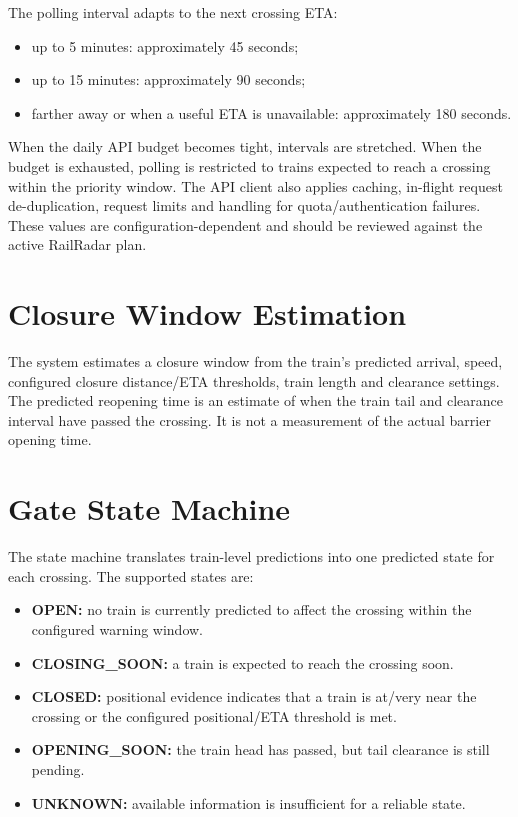 \documentclass[11pt,a4paper]{report}
\begin{document}
The polling interval adapts to the next crossing ETA:
\begin{itemize}
  \item up to 5 minutes: approximately 45 seconds;
  \item up to 15 minutes: approximately 90 seconds;
  \item farther away or when a useful ETA is unavailable: approximately 180 seconds.
\end{itemize}
When the daily API budget becomes tight, intervals are stretched. When the budget is exhausted, polling is restricted to trains expected to reach a crossing within the priority window. The API client also applies caching, in-flight request de-duplication, request limits and handling for quota/authentication failures. These values are configuration-dependent and should be reviewed against the active RailRadar plan.

\section{Closure Window Estimation}
The system estimates a closure window from the train's predicted arrival, speed, configured closure distance/ETA thresholds, train length and clearance settings. The predicted reopening time is an estimate of when the train tail and clearance interval have passed the crossing. It is not a measurement of the actual barrier opening time.

\section{Gate State Machine}
The state machine translates train-level predictions into one predicted state for each crossing. The supported states are:
\begin{itemize}
  \item \textbf{OPEN:} no train is currently predicted to affect the crossing within the configured warning window.
  \item \textbf{CLOSING\_SOON:} a train is expected to reach the crossing soon.
  \item \textbf{CLOSED:} positional evidence indicates that a train is at/very near the crossing or the configured positional/ETA threshold is met.
  \item \textbf{OPENING\_SOON:} the train head has passed, but tail clearance is still pending.
  \item \textbf{UNKNOWN:} available information is insufficient for a reliable state.
\end{itemize}
\end{document}
